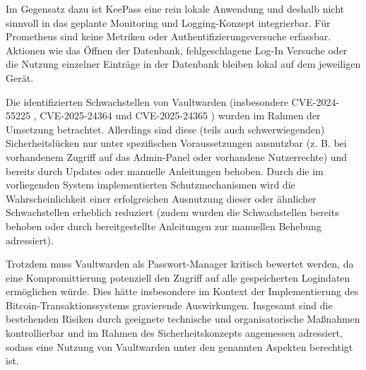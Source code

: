 Im Gegensatz dazu ist KeePass eine rein lokale Anwendung und deshalb nicht sinnvoll in das geplante Monitoring und Logging-Konzept integrierbar. Für Prometheus sind keine Metriken oder Authentifizierungsversuche erfassbar. Aktionen wie das Öffnen der Datenbank, fehlgeschlagene Log-In Versuche oder die Nutzung einzelner Einträge in der Datenbank bleiben lokal auf dem jeweiligen Gerät. 

Die identifizierten Schwachstellen von Vaultwarden (insbesondere \ac{CVE}-2024-55225 \cite{nist_cve_2024_55225}, \ac{CVE}-2025-24364 \cite{nist_cve_2025_24364} und \ac{CVE}-2025-24365 \cite{nist_cve_2025_24365}) wurden im Rahmen der Umsetzung betrachtet. Allerdings sind diese (teils auch schwerwiegenden) Sicherheitslücken nur unter spezifischen Voraussetzungen ausnutzbar (z. B. bei vorhandenem Zugriff auf das Admin-Panel oder vorhandene Nutzerrechte) und bereits durch Updates oder manuelle Anleitungen behoben. Durch die im vorliegenden System implementierten Schutzmechanismen wird die Wahrscheinlichkeit einer erfolgreichen Ausnutzung dieser oder ähnlicher Schwachstellen erheblich reduziert (zudem wurden die Schwachstellen bereits behoben oder durch bereitgestellte Anleitungen zur manuellen Behebung adressiert).

Trotzdem muss Vaultwarden als Passwort-Manager kritisch bewertet werden, da eine Kompromittierung potenziell den Zugriff auf alle gespeicherten Logindaten ermöglichen würde. Dies hätte insbesondere im Kontext der Implementierung des Bitcoin-Transaktionssystems gravierende Auswirkungen. Insgesamt sind die bestehenden Risiken durch geeignete technische und organisatorische Maßnahmen kontrollierbar und im Rahmen des Sicherheitskonzepts angemessen adressiert, sodass eine Nutzung von Vaultwarden unter den genannten Aspekten berechtigt ist.
